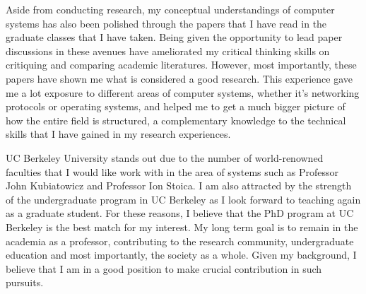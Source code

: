 \documentclass[11pt]{article}
\begin{document}
Aside from conducting research, my conceptual understandings of computer systems has also been polished through the papers that I have read in the graduate classes that I have taken. Being given the opportunity to lead paper discussions in these avenues have ameliorated my critical thinking skills on critiquing and comparing academic literatures. However, most importantly, these papers have shown me what is considered a good research. This experience gave me a lot exposure to different areas of computer systems, whether it's networking protocols or operating systems, and helped me to get a much bigger picture of how the entire field is structured, a complementary knowledge to the technical skills that I have gained in my research experiences. \newline

UC Berkeley University stands out due to the number of world-renowned faculties that I would like work with in the area of systems such as Professor John Kubiatowicz and Professor Ion Stoica. I am also attracted by the strength of the undergraduate program in UC Berkeley as I look forward to teaching again as a graduate student. For these reasons, I believe that the PhD program at UC Berkeley is the best match for my interest. My long term goal is to remain in the academia as a professor, contributing to the research community, undergraduate education and most importantly, the society as a whole. Given my background, I believe that I am in a good position to make crucial contribution in such pursuits. \newline



\end{document}
